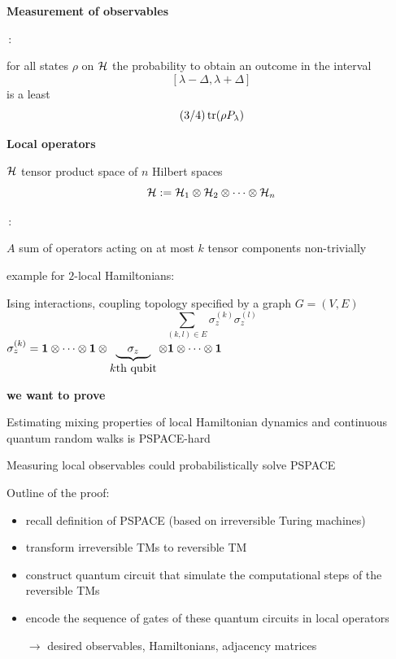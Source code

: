 \documentclass[portrait]{seminar}
\newcommand{\cH}{{\cal H}}
\newcommand{\onemat}{{\bf 1}}
\begin{document}
\begin{slide}
{\large {\bf Measurement of observables}}

\vspace{0.5cm} 
{}\,:

for all states $\rho$ on $\cH$ the probability to obtain an outcome in
the interval
\[
[\lambda-\Delta,\lambda+\Delta]
\]
is a least 
\[
(3/4)\, {\rm tr}(\rho P_{\lambda})
\]
\end{slide}

\begin{slide}
{\large {\bf Local operators}}

\vspace{0.5cm}
$\cH$ tensor product space of $n$ Hilbert spaces
\[
\cH:=\cH_1\otimes\cH_2\otimes\cdots\otimes\cH_n
\]

\vspace{0.5cm}
{}\,:

$A$ sum of operators acting on at most $k$ tensor components
non-trivially

\vspace{0.5cm}
example for $2$-local Hamiltonians:

Ising interactions, coupling topology specified by a graph $G=(V,E)$
\[
\sum_{(k,l)\in E} \sigma_z^{(k)}\sigma_z^{(l)}
\]
$\sigma_z^{(k)}=\onemat\otimes\cdots\otimes\onemat\otimes
\underbrace{\quad\sigma_z\quad}_{\mbox{$k$th qubit}}
\otimes\onemat\otimes\cdots\otimes\onemat$
\end{slide}

\begin{slide}
{\bf we want to prove}

\vfill

\begin{center}
{\large \blue Estimating mixing properties of local Hamiltonian
dynamics and continuous quantum random walks is PSPACE-hard}

\vfill

{\large \blue Measuring local observables could probabilistically
solve PSPACE}

\vfill
\end{center}

Outline of the proof:
\begin{itemize}
\item recall definition of PSPACE (based on irreversible Turing machines)
\item transform irreversible TMs to reversible TM
\item construct quantum circuit that simulate the computational steps
of the reversible TMs
\item encode the sequence of gates of these quantum circuits in local
operators

$\longrightarrow$ desired observables, Hamiltonians, adjacency
matrices
\end{itemize}
\vfill
\end{slide}
\end{document}
